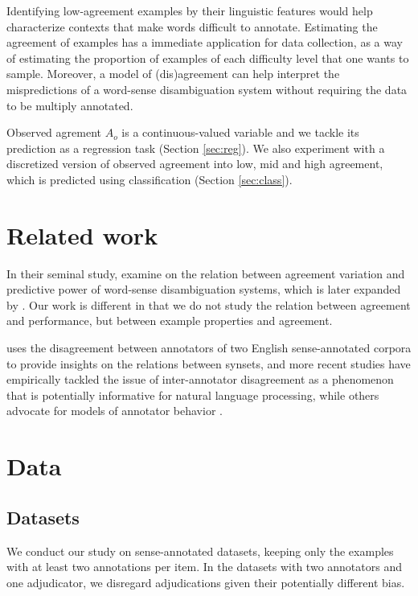 \documentclass[11pt,a4paper]{article}
\begin{document}
Identifying low-agreement examples by their linguistic features would help characterize contexts that make words difficult to annotate. Estimating the agreement of examples has a immediate application for data collection, as a way of estimating the proportion of examples of each difficulty level that one wants to sample. Moreover, a model of (dis)agreement can help interpret the mispredictions of a word-sense disambiguation system without requiring the data to be multiply annotated. 

Observed agrement $A_o$ is a continuous-valued variable and we tackle its prediction as a regression task (Section \ref{sec:reg}). We also experiment with a discretized version of observed agreement into low, mid and high agreement, which is predicted using classification (Section \ref{sec:class}).  

\section{Related work}
In their seminal study,  examine on the relation between agreement variation and predictive power of word-sense disambiguation systems, which is later expanded by . Our work is different in that we do not study the relation between agreement and performance, but between example properties and agreement.

 uses the disagreement between annotators of two English sense-annotated corpora to provide insights on the relations between synsets, and more recent studies \cite{Plank2014,Jurgens2013,Jurgens2014} have empirically tackled the issue of inter-annotator disagreement as a phenomenon that is potentially informative for natural language processing, while others advocate for models of annotator behavior \cite{Passonneau2014,Cohn2013}. 

\section{Data}
\subsection{Datasets}

We conduct our study on sense-annotated datasets, keeping only the examples with at least two annotations per item. 
In the datasets with two annotators and one adjudicator, we disregard adjudications given their potentially different bias.
\end{document}
